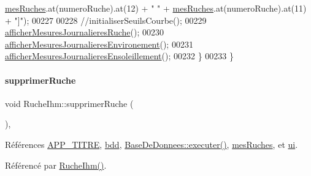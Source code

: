 \begin{DoxyCode}
      \hyperlink{class_ruche_ihm_ab7741fa67b19cbb2da7eb12c58cf83c1}{mesRuches}.at(numeroRuche).at(12) + \textcolor{stringliteral}{" "} + \hyperlink{class_ruche_ihm_ab7741fa67b19cbb2da7eb12c58cf83c1}{mesRuches}.at(numeroRuche).at(11) + \textcolor{stringliteral}{"]"});
00227 
00228         \textcolor{comment}{//initialiserSeuilsCourbe();}
00229         \hyperlink{class_ruche_ihm_a94bd98327a73a15aad1306fc31f53ce8}{afficherMesuresJournalieresRuche}();
00230         \hyperlink{class_ruche_ihm_a5ee5942435915ca134765f42ff4b9061}{afficherMesuresJournalieresEnvironement}();
00231         \hyperlink{class_ruche_ihm_abc250d15e6782c522b3d6676e0ee032d}{afficherMesuresJournalieresEnsoleillement}();
00232     \}
00233 \}
\end{DoxyCode}
\mbox{\label{class_ruche_ihm_a85729b1ae4f3dfb5130eb45f5a426e3c}} 
\paragraph{\texorpdfstring{supprimer\+Ruche}{supprimerRuche}}
{\footnotesize\ttfamily void Ruche\+Ihm\+::supprimer\+Ruche (\begin{DoxyParamCaption}{ }\end{DoxyParamCaption})\hspace{0.3cm}{\ttfamily [private]}, {\ttfamily [slot]}}



Références \hyperlink{parametres_8h_ace364d1ce44aa9f79bcff6e3752c4a5f}{A\+P\+P\+\_\+\+T\+I\+T\+RE}, \hyperlink{class_ruche_ihm_a0851936fe212e8d40538264f09749153}{bdd}, \hyperlink{class_base_de_donnees_aa8de5f8f8bb17edc43f5c0ee33712081}{Base\+De\+Donnees\+::executer()}, \hyperlink{class_ruche_ihm_ab7741fa67b19cbb2da7eb12c58cf83c1}{mes\+Ruches}, et \hyperlink{class_ruche_ihm_a64786058bd7f88ca2f1e9743bb27c25b}{ui}.



Référencé par \hyperlink{class_ruche_ihm_a04c2544ba4e9cca6c38f553c32d63dee}{Ruche\+Ihm()}.


